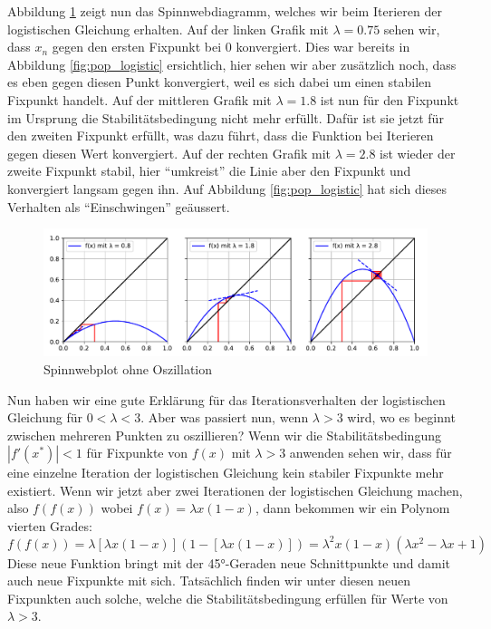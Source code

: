 Abbildung \ref{fig:web_1} zeigt nun das Spinnwebdiagramm,
welches wir beim Iterieren der logistischen Gleichung erhalten.  
Auf der linken Grafik mit $\lambda = 0.75$ sehen wir,
dass $x_n$ gegen den ersten Fixpunkt bei $0$ konvergiert. 
Dies war bereits in Abbildung \ref{fig:pop_logistic} ersichtlich,
hier sehen wir aber zusätzlich noch, dass es eben gegen
diesen Punkt konvergiert, weil es sich dabei um einen
stabilen Fixpunkt handelt.  
Auf der mittleren Grafik mit $\lambda = 1.8$ ist nun für den
Fixpunkt im Ursprung die Stabilitätsbedingung nicht
mehr erfüllt. 
Dafür ist sie jetzt für den zweiten Fixpunkt erfüllt, 
was dazu führt, dass die Funktion bei Iterieren gegen 
diesen Wert konvergiert.  
Auf der rechten Grafik mit $\lambda = 2.8$ ist wieder der  
zweite Fixpunkt stabil, hier ``umkreist'' die Linie aber
den Fixpunkt und konvergiert langsam gegen ihn. 
Auf Abbildung \ref{fig:pop_logistic} hat sich dieses Verhalten
als ``Einschwingen'' geäussert.
\begin{figure}
    \includegraphics[width=\linewidth]{papers/logistic/figures/web_1.pdf}
    \caption{Spinnwebplot ohne Oszillation}
    \label{fig:web_1}
\end{figure}

Nun haben wir eine gute Erklärung für das Iterationsverhalten
der logistischen Gleichung für $0 < \lambda < 3$. 
Aber was passiert nun, wenn $\lambda > 3$ wird,
wo es beginnt zwischen mehreren Punkten zu oszillieren?
Wenn wir die Stabilitätsbedingung $|f'(x^*)| < 1$
für Fixpunkte von $f(x)$ mit $\lambda > 3$ anwenden sehen wir,
dass für eine einzelne Iteration der logistischen 
Gleichung kein stabiler Fixpunkte mehr existiert. 
Wenn wir jetzt aber zwei Iterationen der logistischen
Gleichung machen, also 
$f(f(x))$ wobei $f(x)=\lambda x (1-x)$,
dann bekommen wir ein Polynom vierten Grades:
\begin{equation}
    f(f(x))
    =
    \lambda [\lambda x (1-x)] (1-[\lambda x (1-x)])
    =
    \lambda^2 x (1-x) (\lambda x^2 - \lambda x + 1)
\end{equation}
Diese neue Funktion bringt mit der 45°-Geraden 
neue Schnittpunkte und damit auch neue Fixpunkte mit sich.
Tatsächlich finden wir unter diesen neuen Fixpunkten 
auch solche, welche die Stabilitätsbedingung erfüllen für
Werte von $\lambda > 3$.


